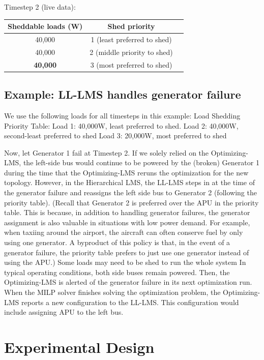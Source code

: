 \documentclass{acm_proc_article-sp}
\begin{document}
Timestep 2 (live data): \\
\begin{tabular}{c|cc}
Sheddable loads (W) & Shed priority \\ \hline
40,000 & 1 (least preferred to shed) \\
40,000 & 2 (middle priority to shed) \\ 
{\bf 40,000} & 3 (most preferred to shed) \\ \hline
\end{tabular}

\subsection{Example: LL-LMS handles generator failure}

We use the following loads for all timesteps in this example:
    Load Shedding Priority Table:
    Load 1: 40,000W, least preferred to shed.
    Load 2: 40,000W, second-least preferred to shed
    Load 3: 20,000W, most preferred to shed

Now, let Generator 1 fail at Timestep 2. 
If we solely relied on the Optimizing-LMS, the left-side bus would continue to be powered by the (broken) Generator 1 during the time that the Optimizing-LMS reruns the optimization for the new topology.
However, in the Hierarchical LMS, the LL-LMS steps in at the time of the generator failure and reassigns the left side bus to Generator 2 (following the priority table). 
(Recall that Generator 2 is preferred over the APU in the priority table. This is because, in addition to handling generator failures, the generator assignment is also valuable in situations with low power demand. For example, when taxiing around the airport, the aircraft can often conserve fuel by only using one generator. A byproduct of this policy is that, in the event of a generator failure, the priority table prefers to just use one generator instead of using the APU.)
Some loads may need to be shed to run the whole system In typical operating conditions, both side buses remain powered. 
Then, the Optimizing-LMS is alerted of the generator failure in its next optimization run. 
When the MILP solver finishes solving the optimization problem, the Optimizing-LMS reports a new configuration to the LL-LMS. 
This configuration would include assigning APU to the left bus.


\section{Experimental Design}
\end{document}
